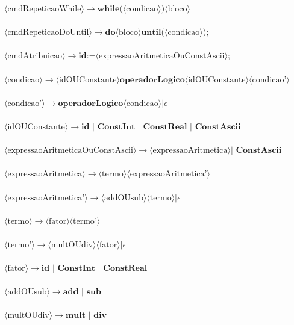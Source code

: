 \documentclass[11pt]{article}
\begin{document}
$\langle\text{cmdRepeticaoWhile}\rangle \rightarrow \textbf{while(} \langle\text{condicao}\rangle \textbf{)} \langle\text{bloco}\rangle $\\\\
$\langle\text{cmdRepeticaoDoUntil}\rangle \rightarrow \textbf{do} \langle\text{bloco}\rangle \textbf{until(} \langle\text{condicao}\rangle \textbf{)} \textbf{;}$\\\\
$\langle\text{cmdAtribuicao}\rangle \rightarrow  \textbf{id} \textbf{:=} \langle\text{expressaoAritmeticaOuConstAscii}\rangle \textbf{;} $\\\\
$\langle\text{condicao}\rangle \rightarrow  \langle\text{idOUConstante}\rangle \textbf{operadorLogico} \langle\text{idOUConstante}\rangle \langle\text{condicao'}\rangle $\\\\
$\langle\text{condicao'}\rangle \rightarrow  \textbf{operadorLogico} \langle\text{condicao}\rangle | \epsilon $\\\\
$\langle\text{idOUConstante}\rangle \rightarrow  \textbf{id }|  \textbf{ ConstInt } | \textbf{ ConstReal } | \textbf{ ConstAscii}$\\\\
$\langle\text{expressaoAritmeticaOuConstAscii}\rangle \rightarrow \langle\text{expressaoAritmetica}\rangle | \textbf{ ConstAscii}$\\\\
$\langle\text{expressaoAritmetica}\rangle \rightarrow  \langle\text{termo}\rangle \langle\text{expressaoAritmetica'}\rangle$\\\\
$\langle\text{expressaoAritmetica'}\rangle \rightarrow \langle\text{addOUsub}\rangle \langle\text{termo}\rangle | \epsilon $\\\\
$\langle\text{termo}\rangle \rightarrow \langle\text{fator}\rangle \langle\text{termo'}\rangle $\\\\
$\langle\text{termo'}\rangle \rightarrow \langle\text{multOUdiv}\rangle \langle\text{fator}\rangle | \epsilon $\\\\
$\langle\text{fator}\rangle \rightarrow \textbf{id }| \textbf{ ConstInt } | \textbf{ ConstReal } $\\\\
$\langle\text{addOUsub}\rangle \rightarrow  \textbf{add } | \textbf{ sub}$ \\\\
$\langle\text{multOUdiv}\rangle \rightarrow  \textbf{mult } | \textbf{ div}$ \\\\
\end{document}
